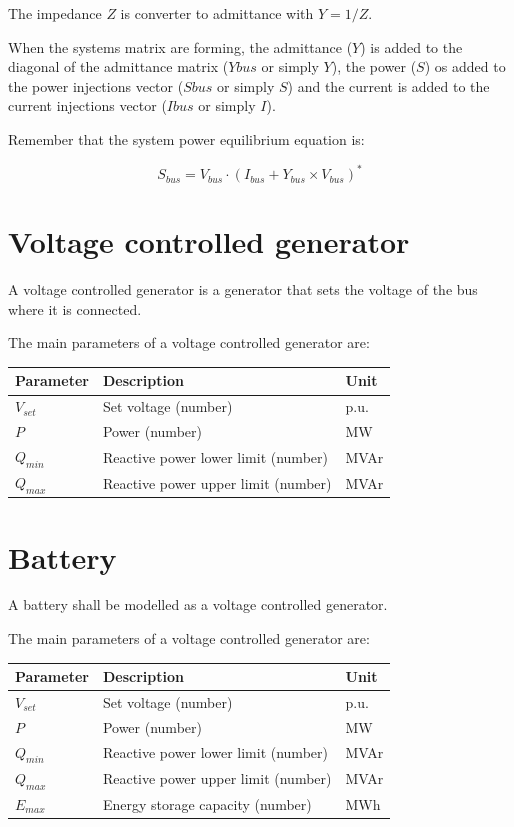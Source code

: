 \documentclass[nols,a4paper,twoside,notoc,fleqn]{tufte-book}
\begin{document}
The impedance $Z$ is converter to admittance with $Y=1/Z$.

When the systems matrix are forming, the admittance ($Y$) is added to the diagonal of the admittance matrix ($Ybus$ or simply $Y$), the power ($S$) os added to the power injections vector ($Sbus$ or simply $S$) and the current is added to the current injections vector ($Ibus$ or simply $I$).

Remember that the system power equilibrium equation is:

$$
S_{bus} = V_{bus} \cdot (I_{bus} + Y_{bus} \times V_{bus})^*
$$


\section{Voltage controlled generator}

A voltage controlled generator is a generator that sets the voltage of the bus where it is connected.

The main parameters of a voltage controlled generator are:\\
\begin{tabular}{|l|p{5cm}|p{2cm}|}
	\hline 
	Parameter & Description & Unit \\ 
	\hline 
	$V_{set}$ & Set voltage (number) & p.u. \\ 
	\hline 
	$P$ & Power (number) & MW \\ 
	\hline
	$Q_{min}$ & Reactive power lower limit (number) & MVAr \\ 
	\hline
	$Q_{max}$ & Reactive power upper limit (number) & MVAr \\ 
	\hline
\end{tabular} 

\vspace{0.5cm}


\section{Battery}

A battery shall be modelled as a voltage controlled generator.

The main parameters of a voltage controlled generator are:\\
\begin{tabular}{|l|p{5cm}|p{2cm}|}
	\hline 
	Parameter & Description & Unit \\ 
	\hline 
	$V_{set}$ & Set voltage (number) & p.u. \\ 
	\hline 
	$P$ & Power (number) & MW \\ 
	\hline
	$Q_{min}$ & Reactive power lower limit (number) & MVAr \\ 
	\hline
	$Q_{max}$ & Reactive power upper limit (number) & MVAr \\ 
	\hline
	$E_{max}$ & Energy storage capacity (number) & MWh \\ 
	\hline
\end{tabular} 
\end{document}
